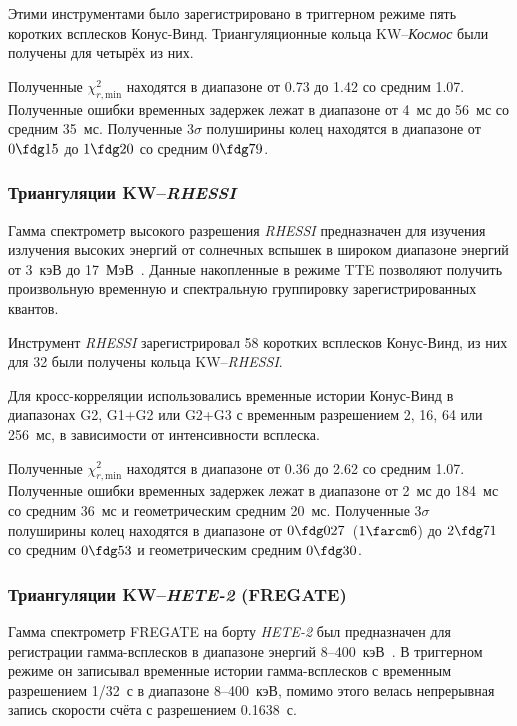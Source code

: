 Этими инструментами было зарегистрировано в триггерном режиме пять коротких 
всплесков Конус-Винд. Триангуляционные кольца KW--\textit{Космос} были 
получены для четырёх из них.

Полученные $\chi^2_{r,\textrm{min}}$ находятся в диапазоне от 0.73 до 1.42 со средним 1.07. 
Полученные ошибки временных задержек лежат в диапазоне от 4~мс до 56~мс со средним 35~мс. 
Полученные $3\sigma$ полуширины колец находятся в диапазоне от $0\fdg15$ 
до $1\fdg20$ со средним $0\fdg79$.

\subsubsection{Триангуляции KW--\textit{RHESSI}}
Гамма спектрометр высокого разрешения \textit{RHESSI} предназначен для изучения 
излучения высоких энергий от солнечных вспышек в широком диапазоне энергий 
от 3~кэВ до 17~МэВ~\citep{Lin_2002SoPh, Smith_2002SoPh}. Данные накопленные в режиме TTE 
позволяют получить произвольную временную и спектральную группировку зарегистрированных квантов.

Инструмент \textit{RHESSI} зарегистрировал 58 коротких всплесков Конус-Винд, из 
них для 32 были получены кольца KW--\textit{RHESSI}.

Для кросс-корреляции использовались временные истории Конус-Винд 
в диапазонах G2, G1+G2 или G2+G3 с временным разрешением 2, 16, 64 или 256~мс, 
в зависимости от интенсивности всплеска.

Полученные $\chi^2_{r,\textrm{min}}$ находятся в диапазоне от 0.36 до 2.62 со 
средним 1.07. Полученные ошибки временных задержек лежат в диапазоне от 2~мс 
до 184~мс со средним 36~мс и геометрическим средним 20~мс. Полученные $3\sigma$ 
полуширины колец находятся в диапазоне от $0\fdg027$~($1\farcm6$) 
до $2\fdg71$ со средним $0\fdg53$ 
и геометрическим средним $0\fdg30$.

\subsubsection{Триангуляции KW--\textit{HETE-2} (FREGATE)}
Гамма спектрометр FREGATE на борту \textit{HETE-2} был предназначен для регистрации 
гамма-всплесков в диапазоне энергий 8--400~кэВ~\citep{Ricker_2003AIPC, Atteia_2003AIPC}. 
В триггерном режиме он записывал временные истории гамма-всплесков с временным 
разрешением 1/32~с в диапазоне 8--400~кэВ, помимо этого велась непрерывная запись 
скорости счёта с разрешением 0.1638~с.

